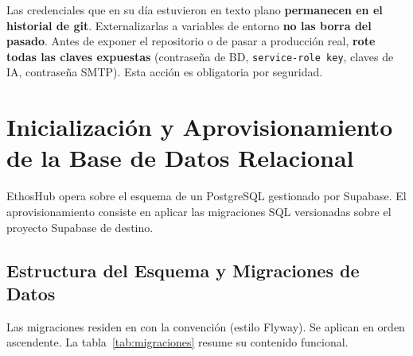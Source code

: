 \begin{PuntoNoRetorno}
Las credenciales que en su día estuvieron en texto plano \textbf{permanecen en el
historial de git}. Externalizarlas a variables de entorno \textbf{no las borra del
pasado}. Antes de exponer el repositorio o de pasar a producción real, \textbf{rote todas
las claves expuestas} (contraseña de BD, \texttt{service-role key}, claves de IA,
contraseña SMTP). Esta acción es obligatoria por seguridad.
\end{PuntoNoRetorno}

\section{Inicialización y Aprovisionamiento de la Base de Datos Relacional}%
\label{sec:bd}

EthosHub opera sobre el esquema  de un PostgreSQL gestionado por Supabase.
El aprovisionamiento consiste en aplicar las migraciones SQL versionadas sobre el proyecto
Supabase de destino.\par

\subsection{Estructura del Esquema y Migraciones de Datos}%
\label{subsec:migraciones}

Las migraciones residen en  con la
convención  (estilo Flyway). Se aplican en orden
ascendente. La tabla~\ref{tab:migraciones} resume su contenido funcional.\par

